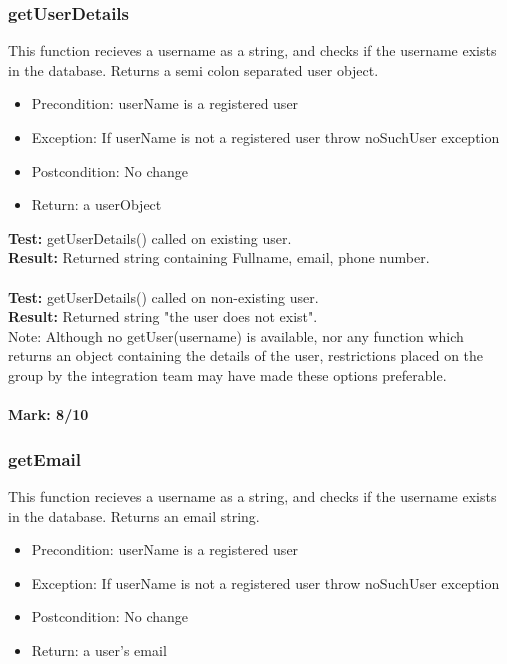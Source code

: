 \documentclass[12pt]{article}
\begin{document}
		\subsubsection{getUserDetails}
			This function recieves a username as a string, and checks if the username exists in the database. Returns a semi colon separated user object.
		
		\begin{itemize}
			\item Precondition: userName is a registered user
			\item Exception: If userName is not a registered user throw noSuchUser exception
			\item Postcondition: No change
			\item Return: a userObject
		\end{itemize}
			
		\noindent \textbf{Test:} getUserDetails() called on existing user.\\
		\textbf{Result:} Returned string containing Fullname, email, phone number.\\\\
		\textbf{Test:} getUserDetails() called on non-existing user.\\
		\textbf{Result:} Returned string "the user does not exist".\\
		
		
		\noindent Note: Although no getUser(username) is available, nor any function which returns an object containing the details of the user, restrictions placed on the group by the integration team may have made these options preferable.\\ \\ \textbf{Mark: 8/10}
		
		\pagebreak
		\subsubsection{getEmail}
			This function recieves a username as a string, and checks if the username exists in the database. Returns an email string.
		
		\begin{itemize}
			\item Precondition: userName is a registered user
			\item Exception: If userName is not a registered user throw noSuchUser exception
			\item Postcondition: No change
			\item Return: a user's email
		\end{itemize}
			
\end{document}
